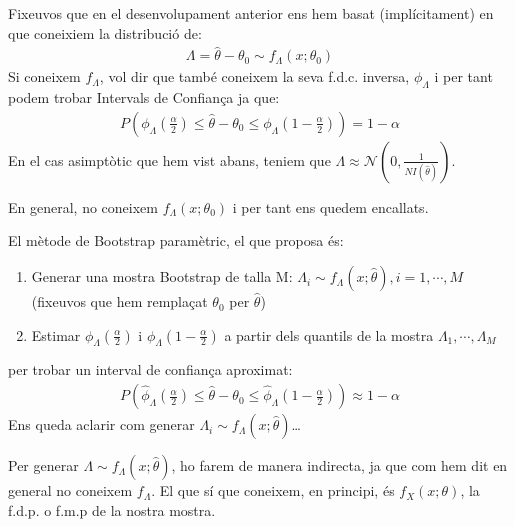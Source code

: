 \documentclass[letterpaper,10pt,english]{sphinxmanual}
\begin{document}
Fixeu\sphinxhyphen{}vos que en el desenvolupament anterior ens hem basat (implícitament)
en que coneixiem la distribució de:
\begin{equation*}
\begin{split}\Lambda = \hat{\theta} - \theta_0 \sim f_{\Lambda}(x;\theta_0)\end{split}
\end{equation*}
Si coneixem \(f_{\Lambda}\), vol dir que també coneixem la seva f.d.c.
inversa, \(\phi_{\Lambda}\) i per tant podem trobar Intervals
de Confiança ja que:
\begin{equation*}
\begin{split}P\left( \phi_{\Lambda}\left(\frac{\alpha}{2}\right)\leq \hat{\theta} - \theta_0 \leq \phi_{\Lambda}\left(1 - \frac{\alpha}{2}\right)\right) = 1 - \alpha\end{split}
\end{equation*}
En el cas asimptòtic que hem vist abans, teniem que \(\Lambda \approx \mathcal{N}\left(0, \frac{1}{N I(\hat{\theta})}\right)\).

En general, no coneixem \(f_{\Lambda}(x;\theta_0)\) i per tant
ens quedem encallats.

El mètode de Bootstrap paramètric, el que proposa és:
\begin{enumerate}
%
\item {} 
Generar una mostra Bootstrap de talla M: \(\Lambda_i \sim f_{\Lambda}(x;\hat{\theta}), i=1, \cdots, M\) (fixeu\sphinxhyphen{}vos que hem remplaçat \(\theta_0\) per \(\hat{\theta}\))

\item {} 
Estimar \(\phi_{\Lambda}\left(\frac{\alpha}{2}\right)\) i \(\phi_{\Lambda}\left(1 - \frac{\alpha}{2}\right)\) a partir dels quantils de la mostra \(\Lambda_1, \cdots, \Lambda_M\)

\end{enumerate}

per trobar un interval de confiança aproximat:
\begin{equation*}
\begin{split}P\left( \hat{\phi}_{\Lambda}\left(\frac{\alpha}{2}\right)\leq \hat{\theta} - \theta_0 \leq \hat{\phi}_{\Lambda}\left(1 - \frac{\alpha}{2}\right)\right) \approx 1 - \alpha\end{split}
\end{equation*}
Ens queda aclarir com generar \(\Lambda_i \sim f_{\Lambda}(x;\hat{\theta})\)…

Per generar \(\Lambda \sim f_{\Lambda}(x;\hat{\theta})\), ho farem
de manera indirecta, ja que com hem dit en general no coneixem
\(f_{\Lambda}\). El que sí que coneixem, en principi, és \(f_X(x;\theta)\),
la f.d.p. o f.m.p de la nostra mostra.
\end{document}
